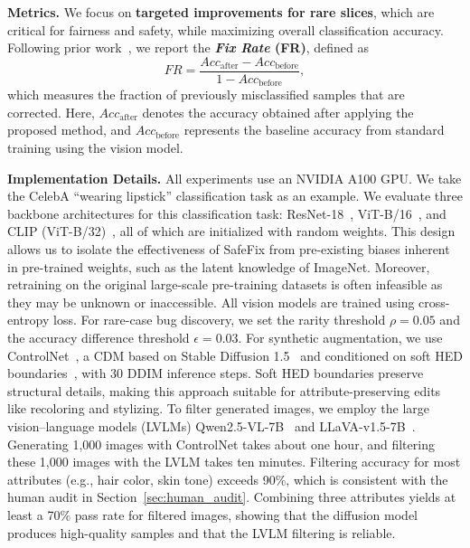 \documentclass[10pt]{article} %
\newcommand{\controlnet}{ControlNet\xspace}
\newcommand{\qwen}{Qwen2.5-VL\xspace}
\newcommand{\llava}{LLaVA-v1.5\xspace}
\begin{document}
\noindent\textbf{Metrics.} We focus on \textbf{targeted improvements for rare slices}, which are critical for fairness and safety, while maximizing overall classification accuracy. Following prior work~\citep{lai2023improvingpredictionbackwardcompatiblilitynlp}, we report the \textbf{\emph{Fix Rate} (FR)}, defined as
\vspace{-4pt}
\begin{equation}
FR = \dfrac{Acc_{\text{after}} - Acc_{\text{before}}}{1 - Acc_{\text{before}}},
\end{equation}
which measures the fraction of previously misclassified samples that are corrected. Here, $Acc_{\text{after}}$ denotes the accuracy obtained after applying the proposed method, and $Acc_{\text{before}}$ represents the baseline accuracy from standard training using the vision model.

\noindent \textbf{Implementation Details.} All experiments use an NVIDIA A100 GPU.  
We take the CelebA ``wearing lipstick'' classification task as an example.  
We evaluate three backbone architectures for this classification task: ResNet-18~\citep{he2016deep}, ViT-B/16~\citep{dosovitskiy2020vit}, and CLIP (ViT-B/32)~\citep{radford2021learning}, all of which are initialized with random weights. This design allows us to isolate the effectiveness of SafeFix from pre-existing biases inherent in pre-trained weights, such as the latent knowledge of ImageNet. Moreover, retraining on the original large-scale pre-training datasets is often infeasible as they may be unknown or inaccessible. All vision models are trained using cross-entropy loss. For rare-case bug discovery, we set the rarity threshold \(\rho = 0.05\) and the accuracy difference threshold \(\epsilon = 0.03\). For synthetic augmentation, we use \controlnet~\citep{zhang2023adding}, a CDM based on Stable Diffusion 1.5~\citep{rombach2022high} and conditioned on soft HED boundaries~\citep{xie2015holistically}, with 30 DDIM inference steps. Soft HED boundaries preserve structural details, making this approach suitable for attribute-preserving edits like recoloring and stylizing.
To filter generated images, we employ the large vision--language models (LVLMs) \qwen{}-7B~\citep{bai2025qwen25vl} and \llava{}-7B~\citep{liu2023improvedllava}. Generating 1,000 images with ControlNet takes about one hour, and filtering these 1,000 images with the LVLM takes ten minutes. Filtering accuracy for most attributes (e.g., hair color, skin tone) exceeds 90\%, which is consistent with the human audit in Section~\ref{sec:human_audit}. Combining three attributes yields at least a 70\% pass rate for filtered images, showing that the diffusion model produces high-quality samples and that the LVLM filtering is reliable.
\end{document}
